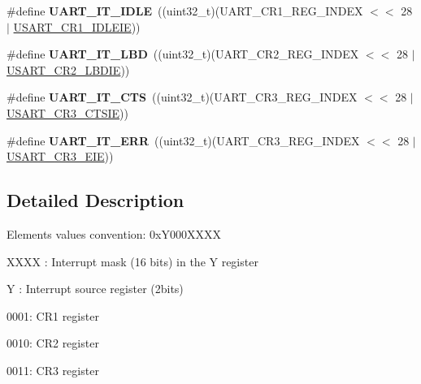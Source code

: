 \begin{DoxyCompactItemize}
\item 
\hypertarget{group___u_a_r_t___interrupt__definition_ga9781808d4f9999061fc2da36572191d9}{\#define {\bfseries U\-A\-R\-T\-\_\-\-I\-T\-\_\-\-I\-D\-L\-E}~((uint32\-\_\-t)(U\-A\-R\-T\-\_\-\-C\-R1\-\_\-\-R\-E\-G\-\_\-\-I\-N\-D\-E\-X $<$$<$ 28 $\vert$ \hyperlink{group___peripheral___registers___bits___definition_ga5221d09eebd12445a20f221bf98066f8}{U\-S\-A\-R\-T\-\_\-\-C\-R1\-\_\-\-I\-D\-L\-E\-I\-E}))}\label{group___u_a_r_t___interrupt__definition_ga9781808d4f9999061fc2da36572191d9}

\item 
\hypertarget{group___u_a_r_t___interrupt__definition_gabca5e77508dc2dd9aa26fcb683d9b988}{\#define {\bfseries U\-A\-R\-T\-\_\-\-I\-T\-\_\-\-L\-B\-D}~((uint32\-\_\-t)(U\-A\-R\-T\-\_\-\-C\-R2\-\_\-\-R\-E\-G\-\_\-\-I\-N\-D\-E\-X $<$$<$ 28 $\vert$ \hyperlink{group___peripheral___registers___bits___definition_gaa02ef5d22553f028ea48e5d9f08192b4}{U\-S\-A\-R\-T\-\_\-\-C\-R2\-\_\-\-L\-B\-D\-I\-E}))}\label{group___u_a_r_t___interrupt__definition_gabca5e77508dc2dd9aa26fcb683d9b988}

\item 
\hypertarget{group___u_a_r_t___interrupt__definition_ga986d271478550f9afa918262ca642333}{\#define {\bfseries U\-A\-R\-T\-\_\-\-I\-T\-\_\-\-C\-T\-S}~((uint32\-\_\-t)(U\-A\-R\-T\-\_\-\-C\-R3\-\_\-\-R\-E\-G\-\_\-\-I\-N\-D\-E\-X $<$$<$ 28 $\vert$ \hyperlink{group___peripheral___registers___bits___definition_ga636d5ec2e9556949fc68d13ad45a1e90}{U\-S\-A\-R\-T\-\_\-\-C\-R3\-\_\-\-C\-T\-S\-I\-E}))}\label{group___u_a_r_t___interrupt__definition_ga986d271478550f9afa918262ca642333}

\item 
\hypertarget{group___u_a_r_t___interrupt__definition_ga8eb26d8edd9bf78ae8d3ad87dd51b618}{\#define {\bfseries U\-A\-R\-T\-\_\-\-I\-T\-\_\-\-E\-R\-R}~((uint32\-\_\-t)(U\-A\-R\-T\-\_\-\-C\-R3\-\_\-\-R\-E\-G\-\_\-\-I\-N\-D\-E\-X $<$$<$ 28 $\vert$ \hyperlink{group___peripheral___registers___bits___definition_gaaed1a39c551b1641128f81893ff558d0}{U\-S\-A\-R\-T\-\_\-\-C\-R3\-\_\-\-E\-I\-E}))}\label{group___u_a_r_t___interrupt__definition_ga8eb26d8edd9bf78ae8d3ad87dd51b618}

\end{DoxyCompactItemize}


\subsection{Detailed Description}
Elements values convention\-: 0x\-Y000\-X\-X\-X\-X
\begin{DoxyItemize}
\item X\-X\-X\-X \-: Interrupt mask (16 bits) in the Y register
\item Y \-: Interrupt source register (2bits)
\begin{DoxyItemize}
\item 0001\-: C\-R1 register
\item 0010\-: C\-R2 register
\item 0011\-: C\-R3 register 
\end{DoxyItemize}
\end{DoxyItemize}